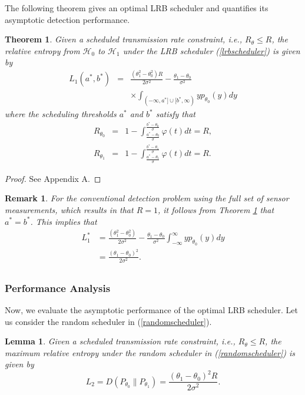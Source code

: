 \documentclass[journal]{IEEEtran}
\def\cH{\mathcal{H}}
\def\beq{\begin{eqnarray}}
\def\enq{\end{eqnarray}}
\newtheorem{lem}{Lemma}
\newtheorem{thm}{Theorem}
\newtheorem{rem}{Remark}
\begin{document}
The following theorem gives an optimal LRB scheduler and quantifies its asymptotic detection performance.

\begin{thm}\label{thm_optimal}
Given a scheduled transmission rate constraint, i.e., $R_\theta\leqslant R$, the relative entropy from $\cH_0$ to $\cH_1$ under the LRB scheduler (\ref{lrbscheduler}) is given by
\beq
L_{1}(a^{*},b^{*}) &=& \frac{{(\theta _1^2 - \theta _0^2)R}}{{2{\sigma ^2}}} - \frac{{{\theta _1} - {\theta _0}}}{{{\sigma ^2}}}\nonumber\\
&&\times\int_{( - \infty ,a^{*}] \cup [b^{*},\infty )}^{} {y{p_{{\theta _0}}}(y)}dy
\enq
where the scheduling thresholds $a^{*}$ and $b^{*}$ satisfy that
\begin{eqnarray}
\label{constraint11}
R_{\theta_0}&=& 1-\int_{\frac{{a^{*} - {\theta _0}}}{\sigma }}^{\frac{{b^{*} - {\theta _0}}}{\sigma }} {\varphi (t)dt}  =R,\\
\label{constraint12}R_{\theta_1}&=& 1-\int_{\frac{{a^{*} - {\theta _1}}}{\sigma }}^{\frac{{b^{*} - {\theta _1}}}{\sigma }} {\varphi (t)dt}  =R.
\end{eqnarray}
\end{thm}

\begin{proof}
See Appendix A.
\end{proof}

\begin{rem}
For the conventional detection problem using the full set of sensor measurements, which results in that $R=1$, it follows from Theorem \ref{thm_optimal} that $a^{*}=b^{*}$. This implies that
\begin{equation}
\begin{split}
L_{1}^{*}&= \frac{{(\theta _1^2 - \theta _0^2)}}{{2{\sigma ^2}}} - \frac{{{\theta _1} - {\theta _0}}}{{{\sigma ^2}}}\int_{ - \infty }^\infty  {y{p_{{\theta _0}}}(y)} dy\\
&= \frac{{{{({\theta _1} - {\theta _0})}^2}}}{{2{\sigma ^2}}}.\\
\end{split}
\end{equation}
\end{rem}

\subsubsection{Performance Analysis}
Now, we evaluate the asymptotic performance of the optimal LRB scheduler. Let us consider the random scheduler in (\ref{randomscheduler}).
\begin{lem}
\label{lem_rdnscheduler}
Given a scheduled transmission rate constraint, i.e., $R_\theta\leqslant R$, the maximum relative entropy under the random scheduler in (\ref{randomscheduler}) is given by
\begin{equation}
L_{2}=D({P_{\theta_0}}\lVert{P_{\theta_1}}) = \frac{{{{({\theta _1} - {\theta _0})}^2}}R}{{2{\sigma ^2}}}.
\end{equation}
\end{lem}
\end{document}
